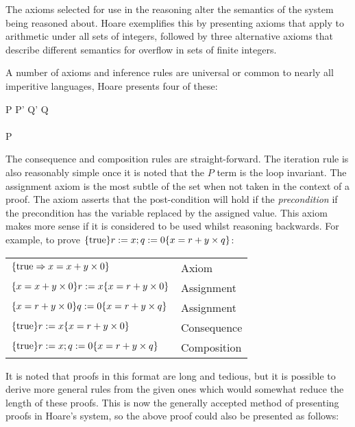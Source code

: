 \documentclass[a4paper]{report}
\begin{document}
  The axioms selected for use in the reasoning alter the semantics of the system
  being reasoned about. Hoare exemplifies this by presenting axioms that apply
  to arithmetic under all sets of integers, followed by three alternative axioms
  that describe different semantics for overflow in sets of finite integers.

  A number of axioms and inference rules are universal or common to nearly all
  imperitive languages, Hoare presents four of these:
  \begin{display}{}
    {} \qquad

    { \quad P \impl P' \quad Q' \impl Q}
    {} \\
    \\
    {P \quad {}}
    {} \qquad

    { \quad {}}
    {}
  \end{display}

  The consequence and composition rules are straight-forward. The iteration rule
  is also reasonably simple once it is noted that the $P$ term is the loop
  invariant. The assignment axiom is the most subtle of the set when not taken
  in the context of a proof. The axiom asserts that the post-condition will hold
  if the \emph{precondition} if the precondition has the variable replaced by
  the assigned value. This axiom makes more sense if it is considered to be used
  whilst reasoning backwards. For example, to prove $\{{\mathrm{true}}\}r := x; q :=
  0\{x = r + y \times q\}$:

  \begin{tabular}{ll}
    $\{{\mathrm{true}} \Rightarrow x = x + y \times 0 \}$ & Axiom \\
    $\{x = x + y \times 0\}r:=x\{x = r + y \times 0\}$ & Assignment \\
    $\{x = r + y \times 0\}q:=0\{x = r + y \times q\}$ & Assignment \\
    $\{{\mathrm{true}}\}r:=x\{x = r + y \times 0\}$ & Consequence \\
    $\{{\mathrm{true}}\}r:=x; q:=0\{x = r + y \times q\}$ & Composition\\
  \end{tabular}

  It is noted that proofs in this format are long and tedious, but it is
  possible to derive more general rules from the given ones which would somewhat
  reduce the length of these proofs. This is now the generally accepted method
  of presenting proofs in Hoare's system, so the above proof could also be
  presented as follows:
\end{document}
